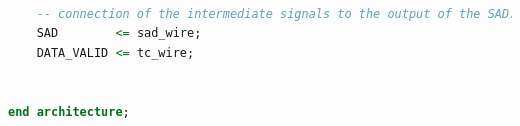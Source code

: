 \documentclass[12pt, a4paper]{article}
\begin{document}
\begin{appendices}
\begin{lstlisting}[language=vhdl]
	
	-- connection of the intermediate signals to the output of the SAD.
	SAD        <= sad_wire;
	DATA_VALID <= tc_wire;


end architecture;


\end{lstlisting}




\end{appendices}
\end{document}
